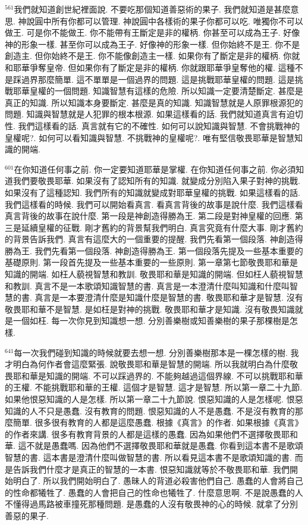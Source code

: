 \documentclass{book}
\begin{document}
$^{561}$我們就知道創世紀裡面說.
不要吃那個知道善惡術的果子.
我們就知道是甚麼意思.
神說圓中所有你都可以管理.
神說圓中各樣術的果子你都可以吃.
唯獨你不可以做王.
可是你不能做王.
你不能帶有王斷定是非的權柄.
你甚至可以成為王子.
好像神的形象一樣.
甚至你可以成為王子.
好像神的形象一樣.
但你始終不是王.
你不是創造主.
但你始終不是王.
你不能像創造主一樣.
如果你有了斷定是非的權柄.
你就和耶華爭奪皇帝.
但如果你有了斷定是非的權柄.
你就跟耶華爭皇奪他的權.
這種不是踩過界那麼簡單.
這不單單是一個過界的問題.
這是挑戰耶華皇權的問題.
這是挑戰耶華皇權的一個問題.
知識智慧有這樣的危險.
所以知識一定要清楚斷定.
甚麼是真正的知識.
所以知識本身要斷定.
甚麼是真的知識.
知識智慧就是人原罪根源犯的問題.
知識與智慧就是人犯罪的根本根源.
如果這樣看的話.
我們就知道真言有迫切性.
我們這樣看的話.
真言就有它的不確性.
如何可以說知識與智慧.
不會挑戰神的皇權呢?.
如何可以看知識與智慧.
不挑戰神的皇權呢?.
唯有堅信敬畏耶華是智慧知識的開端.

$^{601}$在你知道任何事之前.
你一定要知道耶華是掌權.
在你知道任何事之前.
你必須知道我們要敬畏耶華.
如果沒有了認知所有的知識.
就變成分別陷入果子對神的挑戰.
如果沒有了這種認知.
我們所有的知識就變成對耶華皇權的挑戰.
如果這樣看的話.
我們這樣看的時候.
我們可以開始看真言.
看真言背後的故事是說什麼.
我們這樣看真言背後的故事在說什麼.
第一段是神創造得勝為王.
第二段是對神皇權的回應.
第三是延續皇權的征戰.
剛才舊約的背景幫我們明白.
真言究竟有什麼大事.
剛才舊約的背景告訴我們.
真言有這麼大的一個重要的提醒.
我們先看第一個段落.
神創造得勝為王.
我們先看第一個段落.
神創造得勝為王.
第一個段落先提及一些基本重要的基礎原則.
第一段首先提及一些基本重要的一些原則.
第一章第七節敬畏耶和華是知識的開端.
如枉人藐視智慧和教訓.
敬畏耶和華是知識的開端.
但如枉人藐視智慧和教訓.
真言不是一本歌頌知識智慧的書.
真言是一本澄清什麼叫知識和什麼叫智慧的書.
真言是一本要澄清什麼是知識什麼是智慧的書.
敬畏耶和華才是智慧.
沒有敬畏耶和華不是智慧.
是如枉是對神的挑戰.
敬畏耶和華才是知識.
沒有敬畏知識就是一個如枉.
每一次你見到知識想一想.
分別善樂樹或知善樂樹的果子那棵樹是怎樣.

$^{641}$每一次我們碰到知識的時候就要去想一想.
分別善樂樹那本是一棵怎樣的樹.
我才明白為何作者會這麼緊張.
說敬畏耶和華是智慧的開端.
所以我就明白為什麼敬畏耶和華是知識的開端.
不可以踩過界的.
不能夠越過這個界線.
不可以挑戰耶和華的王權.
不能挑戰耶和華的王權.
這個才是智慧.
這才是智慧.
所以第一章二十九節.
如果他恨惡知識的人是怎樣.
所以第一章二十九節說.
恨惡知識的人是怎樣呢.
恨惡知識的人不只是愚蠢.
沒有教育的問題.
恨惡知識的人不是愚蠢.
不是沒有教育的那麼簡單.
很多很有教育的人都是這麼愚蠢.
根據《真言》的作者.
如果根據《真言》的作者來講.
很多有教育背景的人都是這樣的愚蠢.
因為如果他們不選擇敬畏耶和華.
這不就是愚蠢嗎.
因為他們不選擇敬畏耶和華就是愚蠢.
你看到這本書不是歌頌智慧的書.
這本書是澄清什麼叫做智慧的書.
所以看見這本書不是歌頌知識的書.
而是告訴我們什麼才是真正的智慧的一本書.
恨惡知識就等於不敬畏耶和華.
我們開始明白了.
所以我們開始明白了.
愚昧人的背道必殺害他們自己.
愚蠢的人會將自己的性命都犧牲了.
愚蠢的人會把自己的性命也犧牲了.
什麼意思啊.
不是說愚蠢的人不懂得過馬路被車撞死那種問題.
是愚蠢的人沒有敬畏神的心的時候.
就拿了分別善惡的果子.
\end{document}
